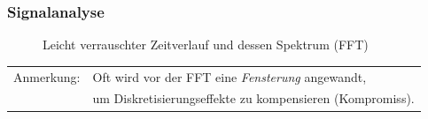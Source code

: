 \documentclass[hyperref={pdfpagemode=FullScreen, colorlinks=false}]{beamer}
\begin{document}
\begin{frame}
\frametitle{Signalanalyse} 

\begin{figure}
   \setlength{\figW}{6.5cm} 
   \setlength{\figH}{5.2cm}
   
\caption*{Leicht verrauschter Zeitverlauf und dessen Spektrum (FFT)}
\end{figure}

\begin{tabular}{ll}
Anmerkung: & Oft wird vor der FFT eine \textsl{Fensterung} angewandt,  \\
 & um Diskretisierungseffekte zu kompensieren (Kompromiss).\\
\end{tabular}

\end{frame}
\end{document}
